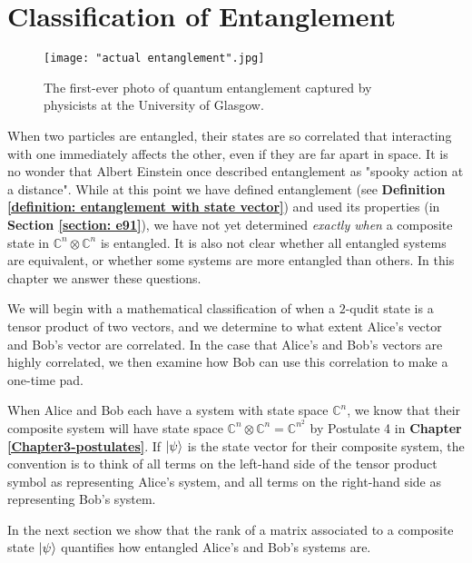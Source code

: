 
\chapter{Classification of Entanglement} %

\label{Chapter6-classification of entanglement} %
\begin{figure}[h]
    \centering
    \texttt{[image: "actual entanglement".jpg]}
    \caption{The first-ever photo of quantum entanglement captured by physicists at the University of Glasgow. \cite{moreau2019imaging}}
    \label{fig:actual entanglemen}
\end{figure}

When two particles are entangled, their states are so correlated that interacting with one immediately affects the other, even if they are far apart in space.  It is no wonder that Albert Einstein once described entanglement as "spooky action at a distance". While at this point we have defined entanglement (see {\bf{Definition} \ref{definition: entanglement with state vector}}) and used its properties (in \textbf{Section \ref{section: e91}}), we have not yet determined {\emph{exactly when}} a composite state in $\mathbb{C}^n \otimes \mathbb{C}^n$ is entangled.
It is also not clear whether all entangled systems are equivalent, or whether some systems are more entangled than others. In this chapter we answer these questions.


We will begin with a mathematical classification of when a $2$-qudit state is a tensor product of two vectors, and we determine to what extent Alice's vector and Bob's vector are correlated. In the case that Alice's and Bob's vectors are highly correlated, we then examine how Bob can use this correlation to make a one-time pad. 

When Alice and Bob each have a system with state space ${\mathbb{C}}^n$, we know that their composite system will have state space ${\mathbb{C}}^n \otimes {\mathbb{C}}^n={\mathbb{C}}^{n^2}$ by Postulate 4 in \textbf{Chapter \ref{Chapter3-postulates}}. If $\ket{\psi}$ is the state vector for their composite system, the convention is to think of all terms on the left-hand side of the tensor product symbol as representing Alice's system, and all terms on the right-hand side as representing Bob's system.  

In the next section we show that the rank of a matrix associated to a composite state $\ket{\psi}$ quantifies how entangled Alice's and Bob's systems are.

